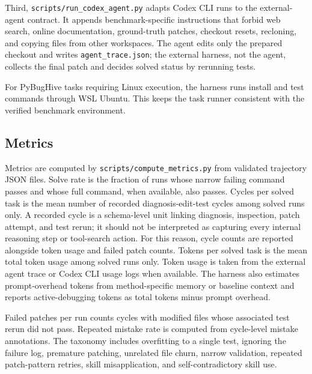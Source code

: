 Third, \texttt{scripts/run\_codex\_agent.py} adapts Codex CLI runs to the external-agent contract. It appends benchmark-specific instructions that forbid web search, online documentation, ground-truth patches, checkout resets, recloning, and copying files from other workspaces. The agent edits only the prepared checkout and writes \texttt{agent\_trace.json}; the external harness, not the agent, collects the final patch and decides solved status by rerunning tests.

For PyBugHive tasks requiring Linux execution, the harness runs install and test commands through WSL Ubuntu. This keeps the task runner consistent with the verified benchmark environment.

\subsection{Metrics}
\label{sec:method_metrics}

Metrics are computed by \texttt{scripts/compute\_metrics.py} from validated trajectory JSON files. Solve rate is the fraction of runs whose narrow failing command passes and whose full command, when available, also passes. Cycles per solved task is the mean number of recorded diagnosis-edit-test cycles among solved runs only. A recorded cycle is a schema-level unit linking diagnosis, inspection, patch attempt, and test rerun; it should not be interpreted as capturing every internal reasoning step or tool-search action. For this reason, cycle counts are reported alongside token usage and failed patch counts. Tokens per solved task is the mean total token usage among solved runs only. Token usage is taken from the external agent trace or Codex CLI usage logs when available. The harness also estimates prompt-overhead tokens from method-specific memory or baseline context and reports active-debugging tokens as total tokens minus prompt overhead.

Failed patches per run counts cycles with modified files whose associated test rerun did not pass. Repeated mistake rate is computed from cycle-level mistake annotations. The taxonomy includes overfitting to a single test, ignoring the failure log, premature patching, unrelated file churn, narrow validation, repeated patch-pattern retries, skill misapplication, and self-contradictory skill use.

